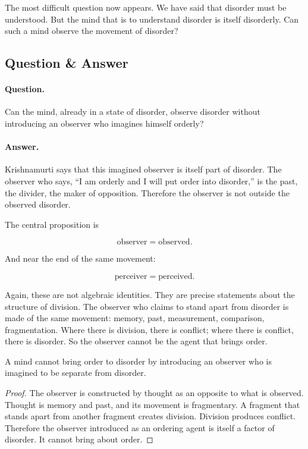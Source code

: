 The most difficult question now appears. We have said that disorder must be understood. But the mind that is to understand disorder is itself disorderly. Can such a mind observe the movement of disorder?

\subsection{Question \& Answer}

\paragraph{Question.}
Can the mind, already in a state of disorder, observe disorder without introducing an observer who imagines himself orderly?

\paragraph{Answer.}
Krishnamurti says that this imagined observer is itself part of disorder. The observer who says, ``I am orderly and I will put order into disorder,'' is the past, the divider, the maker of opposition. Therefore the observer is not outside the observed disorder.

The central proposition is

\begin{equation}
\text{observer}=\text{observed}.
\end{equation}

And near the end of the same movement:

\begin{equation}
\text{perceiver}=\text{perceived}.
\end{equation}

Again, these are not algebraic identities. They are precise statements about the structure of division. The observer who claims to stand apart from disorder is made of the same movement: memory, past, measurement, comparison, fragmentation. Where there is division, there is conflict; where there is conflict, there is disorder. So the observer cannot be the agent that brings order.

\begin{proposition}
A mind cannot bring order to disorder by introducing an observer who is imagined to be separate from disorder.
\end{proposition}

\begin{proof}
The observer is constructed by thought as an opposite to what is observed. Thought is memory and past, and its movement is fragmentary. A fragment that stands apart from another fragment creates division. Division produces conflict. Therefore the observer introduced as an ordering agent is itself a factor of disorder. It cannot bring about order.
\end{proof}

